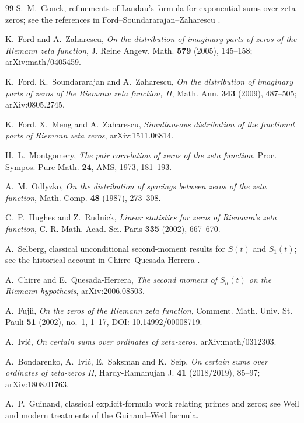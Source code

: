 \documentclass[11pt]{article}
\theoremstyle{definition}
\theoremstyle{remark}
\begin{document}
\begin{thebibliography}{99}
S.~M.~Gonek,
refinements of Landau's formula for exponential sums over zeta zeros;
see the references in Ford--Soundararajan--Zaharescu \cite{FordSoundZaha2009}.

K.~Ford and A.~Zaharescu,
\emph{On the distribution of imaginary parts of zeros of the Riemann zeta function},
J. Reine Angew. Math. \textbf{579} (2005), 145--158;
arXiv:math/0405459.

K.~Ford, K.~Soundararajan and A.~Zaharescu,
\emph{On the distribution of imaginary parts of zeros of the Riemann zeta function, II},
Math. Ann. \textbf{343} (2009), 487--505;
arXiv:0805.2745.

K.~Ford, X.~Meng and A.~Zaharescu,
\emph{Simultaneous distribution of the fractional parts of Riemann zeta zeros},
arXiv:1511.06814.

H.~L.~Montgomery,
\emph{The pair correlation of zeros of the zeta function},
Proc. Sympos. Pure Math. \textbf{24}, AMS, 1973, 181--193.

A.~M.~Odlyzko,
\emph{On the distribution of spacings between zeros of the zeta function},
Math. Comp. \textbf{48} (1987), 273--308.

C.~P.~Hughes and Z.~Rudnick,
\emph{Linear statistics for zeros of Riemann's zeta function},
C. R. Math. Acad. Sci. Paris \textbf{335} (2002), 667--670.

A.~Selberg,
classical unconditional second-moment results for $S(t)$ and $S_1(t)$;
see the historical account in Chirre--Quesada-Herrera \cite{ChirreQuesada2020}.

A.~Chirre and E.~Quesada-Herrera,
\emph{The second moment of $S_n(t)$ on the Riemann hypothesis},
arXiv:2006.08503.

A.~Fujii,
\emph{On the zeros of the Riemann zeta function},
Comment. Math. Univ. St. Pauli \textbf{51} (2002), no.~1, 1--17,
DOI: 10.14992/00008719.

A.~Ivić,
\emph{On certain sums over ordinates of zeta-zeros},
arXiv:math/0312303.

A.~Bondarenko, A.~Ivić, E.~Saksman and K.~Seip,
\emph{On certain sums over ordinates of zeta-zeros II},
Hardy-Ramanujan J. \textbf{41} (2018/2019), 85--97;
arXiv:1808.01763.

A.~P.~Guinand,
classical explicit-formula work relating primes and zeros;
see Weil and modern treatments of the Guinand--Weil formula.


\end{thebibliography}
\end{document}
